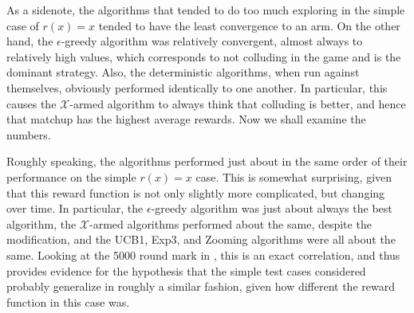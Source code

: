 As a sidenote, the algorithms that tended to do too much exploring in the
simple case of $r(x)=x$ tended to have the least convergence to an arm.
On the other hand, the $\epsilon$-greedy algorithm was relatively
convergent, almost always to relatively high values, which corresponds to
not colluding in the game and is the dominant strategy.  Also, the
deterministic algorithms, when run against themselves, obviously performed
identically to one another.  In particular, this causes the
$\mathcal{X}$-armed algorithm to always think that colluding is better, and
hence that matchup has the highest average rewards.
Now we shall examine the numbers.

Roughly speaking, the algorithms performed just about in the same order of
their performance on the simple $r(x)=x$ case.  This is somewhat surprising,
given that this reward function is not only slightly more complicated, but
changing over time.  In particular, the $\epsilon$-greedy algorithm was
just about always the best algorithm, the $\mathcal{X}$-armed algorithms
performed about the same, despite the modification, and the UCB1, Exp3,
and Zooming algorithms were all about the same.  Looking at the 5000
round mark in , this is an exact correlation, and
thus provides evidence for the hypothesis that the simple test cases
considered probably generalize in roughly a similar fashion, given how
different the reward function in this case was.
